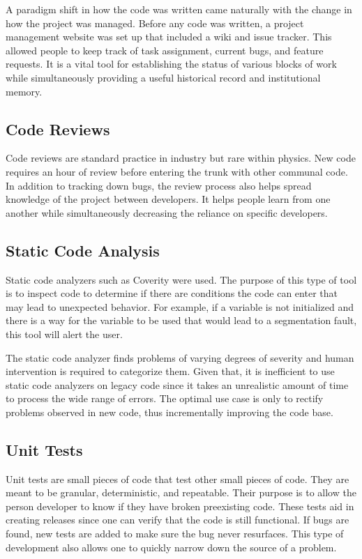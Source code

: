 \documentclass{JAC2003}
\begin{document}
A paradigm shift in how the code was written came naturally with the change in how the project was managed. Before any code was written, a project management website was set up that included a wiki and issue tracker.  This allowed people to keep track of task assignment, current bugs, and feature requests.  It is a vital tool for establishing the status of various blocks of work while simultaneously providing a useful historical record and institutional memory.

\subsection{Code Reviews}

Code reviews are standard practice in industry but rare within physics.   New code requires an hour of review before entering the trunk with other communal code.    In addition to tracking down bugs, the review process also helps spread knowledge of the project between developers.  It helps people learn from one another while simultaneously decreasing the reliance on specific developers.

\subsection{Static Code Analysis}

Static code analyzers such as Coverity \cite{coverity} were used.   The purpose of this type of tool is to inspect code to determine if there are conditions the code can enter that may lead to unexpected behavior.  For example, if a variable is not initialized and there is a way for the variable to be used that would lead to a segmentation fault, this tool will alert the user.

The static code analyzer finds problems of varying degrees of severity and human intervention is required to categorize them. Given that, it is inefficient to use static code analyzers on legacy code since it takes an unrealistic amount of time to process the wide range of errors.  The optimal use case is only to rectify problems observed in new code, thus incrementally improving the code base.

\subsection{Unit Tests}

Unit tests are small pieces of code that test other small pieces of code.  They are meant to be granular, deterministic, and repeatable.  Their purpose is to allow the person developer to know if they have broken preexisting code.  These tests aid in creating releases since one can verify that the code is still functional.  If bugs are found, new tests are added to make sure the bug never resurfaces.  This type of development also allows one to quickly narrow down the source of a problem. 
\end{document}

